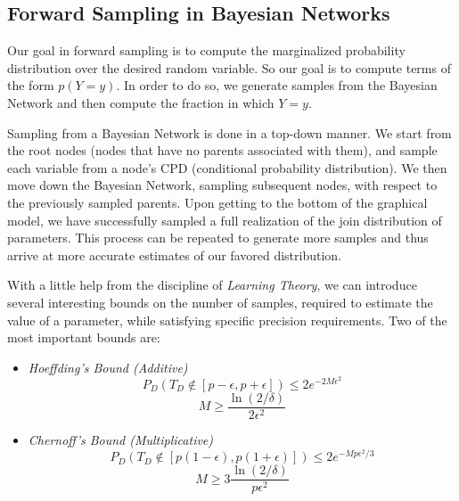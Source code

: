 \documentclass{article}
\begin{document}
\subsection{Forward Sampling in Bayesian Networks}
    Our goal in forward sampling is to compute the marginalized probability distribution over the desired random variable. So our goal is to compute terms of the form $p(Y=y)$. In order to do so, we generate samples from the Bayesian Network and then compute the fraction in which $Y=y$.
    
    Sampling from a Bayesian Network is done in a top-down manner. We start from the root nodes (nodes that have no parents associated with them), and sample each variable from a node's CPD (conditional probability distribution). We then move down the Bayesian Network, sampling subsequent nodes, with respect to the previously sampled parents. Upon getting to the bottom of the graphical model, we have successfully sampled a full realization of the join distribution of parameters. This process can be repeated to generate more samples and thus arrive at more accurate estimates of our favored distribution.

    With a little help from the discipline of \textit{Learning Theory}, we can introduce several interesting bounds on the number of samples, required to estimate the value of a parameter, while satisfying specific precision requirements. Two of the most important bounds are:
    
    \begin{itemize}
        \item \textit{Hoeffding's Bound (Additive)}
            \begin{equation}
                P_D (T_D \notin [p-\epsilon, p+\epsilon]) \leq 2e^{-2M\epsilon^2}                
            \end{equation}
            \begin{equation}
                M \geq \frac{\ln(2/\delta)}{2\epsilon^2}  
            \end{equation}
        \item \textit{Chernoff's Bound (Multiplicative)}
            \begin{equation}
                P_D (T_D \notin [p(1-\epsilon), p(1+\epsilon)]) \leq 2e^{-Mp\epsilon^2/3}                                        
            \end{equation}
            \begin{equation}
                M \geq 3\frac{\ln(2/\delta)}{p\epsilon^2}                  
            \end{equation}            
    \end{itemize}
    
\end{document}
